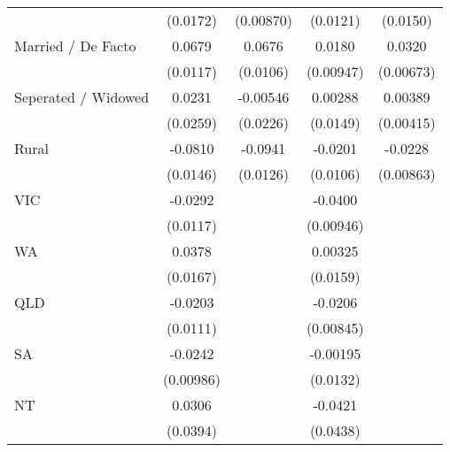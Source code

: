 {\begin{tabular}{l*{4}{c}}
                    &    (0.0172)         &   (0.00870)         &    (0.0121)         &    (0.0150)         \\
[1em]
Married / De Facto  &      0.0679\sym{***}&      0.0676\sym{***}&      0.0180         &      0.0320\sym{***}\\
                    &    (0.0117)         &    (0.0106)         &   (0.00947)         &   (0.00673)         \\
[1em]
Seperated / Widowed &      0.0231         &    -0.00546         &     0.00288         &     0.00389         \\
                    &    (0.0259)         &    (0.0226)         &    (0.0149)         &   (0.00415)         \\
[1em]
Rural               &     -0.0810\sym{***}&     -0.0941\sym{***}&     -0.0201         &     -0.0228\sym{**} \\
                    &    (0.0146)         &    (0.0126)         &    (0.0106)         &   (0.00863)         \\
[1em]
VIC                 &     -0.0292\sym{*}  &                     &     -0.0400\sym{***}&                     \\
                    &    (0.0117)         &                     &   (0.00946)         &                     \\
[1em]
WA                  &      0.0378\sym{*}  &                     &     0.00325         &                     \\
                    &    (0.0167)         &                     &    (0.0159)         &                     \\
[1em]
QLD                 &     -0.0203         &                     &     -0.0206\sym{*}  &                     \\
                    &    (0.0111)         &                     &   (0.00845)         &                     \\
[1em]
SA                  &     -0.0242\sym{*}  &                     &    -0.00195         &                     \\
                    &   (0.00986)         &                     &    (0.0132)         &                     \\
[1em]
NT                  &      0.0306         &                     &     -0.0421         &                     \\
                    &    (0.0394)         &                     &    (0.0438)         &                     \\

\end{tabular}}

